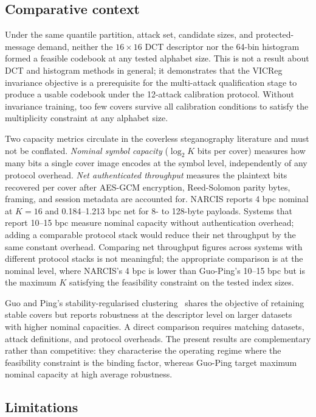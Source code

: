 \documentclass[10pt,journal]{IEEEtran}
\newcommand{\method}{NARCIS\xspace}
\begin{document}
\subsection{Comparative context}

Under the same quantile partition, attack set, candidate sizes, and
protected-message demand, neither the $16\times16$ DCT descriptor nor
the 64-bin histogram formed a feasible codebook at any tested alphabet
size. This is not a result about DCT and histogram methods in general;
it demonstrates that the VICReg invariance objective is a prerequisite
for the multi-attack qualification stage to produce a usable codebook
under the 12-attack calibration protocol. Without invariance training,
too few covers survive all calibration conditions to satisfy the
multiplicity constraint at any alphabet size.

Two capacity metrics circulate in the coverless steganography
literature and must not be conflated. \emph{Nominal symbol capacity}
($\log_2 K$ bits per cover) measures how many bits a single cover image
encodes at the symbol level, independently of any protocol overhead.
\emph{Net authenticated throughput} measures the plaintext bits
recovered per cover after AES-GCM encryption, Reed-Solomon parity
bytes, framing, and session metadata are accounted for. \method reports
4 bpc nominal at $K{=}16$ and 0.184--1.213 bpc net for 8- to 128-byte
payloads. Systems that report 10--15 bpc measure nominal capacity
without authentication overhead; adding a comparable protocol stack
would reduce their net throughput by the same constant overhead.
Comparing net throughput figures across systems with different protocol
stacks is not meaningful; the appropriate comparison is at the nominal
level, where \method's 4 bpc is lower than Guo-Ping's 10--15 bpc but
is the maximum $K$ satisfying the feasibility constraint on the tested
index sizes.

Guo and Ping's stability-regularised clustering~\cite{guo2026capacity}
shares the objective of retaining stable covers but reports robustness
at the descriptor level on larger datasets with higher nominal
capacities. A direct comparison requires matching datasets, attack
definitions, and protocol overheads. The present results are
complementary rather than competitive: they characterise the
operating regime where the feasibility constraint is the binding
factor, whereas Guo-Ping target maximum nominal capacity at high
average robustness.

\subsection{Limitations}
\end{document}
